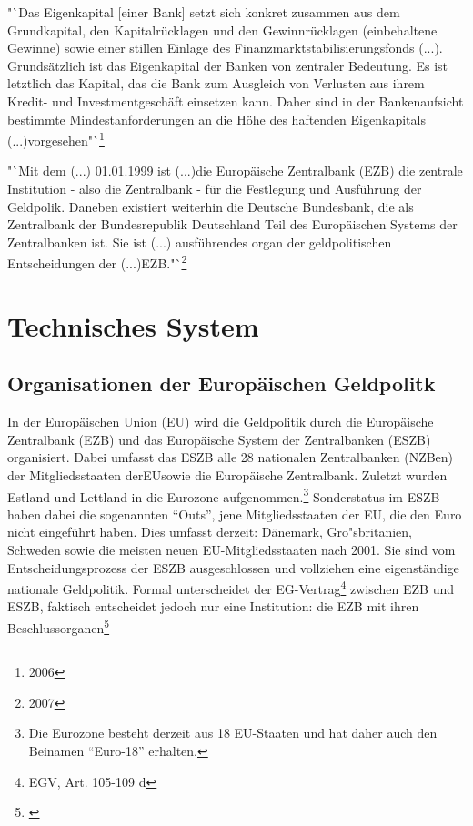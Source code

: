 \documentclass[
        onecolumn,
        a4paper,
        abstracton,
        parskip=half
        ,final
        ]{scrartcl}
\begin{document}
 "`Das Eigenkapital [einer Bank] setzt sich konkret zusammen aus dem Grundkapital, den Kapitalr{\"u}cklagen und den Gewinnr{\"u}cklagen (einbehaltene Gewinne) sowie einer stillen Einlage des Finanzmarktstabilisierungsfonds (...). Grunds{\"a}tzlich ist das Eigenkapital der Banken von zentraler Bedeutung. Es ist letztlich das Kapital, das die Bank zum Ausgleich von Verlusten aus ihrem Kredit- und Investmentgesch{\"a}ft einsetzen kann.  Daher sind in der Bankenaufsicht bestimmte Mindestanforderungen an die H{\"o}he des haftenden Eigenkapitals (...)vorgesehen"`\footnote{2006}{\citep*[vgl.][S.515]{Basseler2010}}

 "`Mit dem (...) 01.01.1999 ist (...)die Europ{\"a}ische Zentralbank (EZB) die zentrale Institution - also die Zentralbank - f{\"u}r die Festlegung und Ausf{\"u}hrung der Geldpolik. Daneben existiert weiterhin die Deutsche Bundesbank, die als Zentralbank der Bundesrepublik Deutschland Teil des Europ{\"a}ischen Systems der Zentralbanken ist. Sie ist (...) ausf{\"u}hrendes organ der geldpolitischen Entscheidungen der (...)EZB."`\footnote{2007}{\citep*[vgl.][S.512]{Basseler2010} }
\clearpage




\section{Technisches System}
  \label{sec2:technischesSystem}

\subsection{Organisationen der Europ{\"a}ischen Geldpolitk}

In der Europ{\"a}ischen Union (EU) wird die Geldpolitik durch die Europ{\"a}ische Zentralbank (EZB) und das Europ{\"a}ische System der Zentralbanken (\ac{ESZB}) organisiert. Dabei umfasst das ESZB alle 28 nationalen Zentralbanken (NZBen) der Mitgliedsstaaten der\ac{EU}sowie die Europ{\"a}ische Zentralbank. Zuletzt wurden Estland und Lettland in die Eurozone aufgenommen.\footnote[98]{Die Eurozone besteht derzeit aus 18 EU-Staaten und hat daher auch den Beinamen "`Euro-18"' erhalten.} Sonderstatus im ESZB haben dabei die sogenannten "`Outs"', jene Mitgliedsstaaten der EU, die den Euro nicht eingef{\"u}hrt haben.
Dies umfasst derzeit: D{\"a}nemark, Gro{"s}britanien, Schweden sowie die meisten neuen EU-Mitgliedsstaaten nach 2001. Sie sind vom Entscheidungsprozess der ESZB ausgeschlossen und vollziehen eine eigenst{\"a}ndige nationale Geldpolitik.
Formal unterscheidet der EG-Vertrag\footnote[25]{\ac{EGV}, Art. 105-109 d} zwischen EZB und ESZB, faktisch entscheidet jedoch nur eine Institution: die EZB mit ihren Beschlussorganen\footnote[99]{\citep*[vgl.][S.553]{Basseler2010}}
\end{document}
